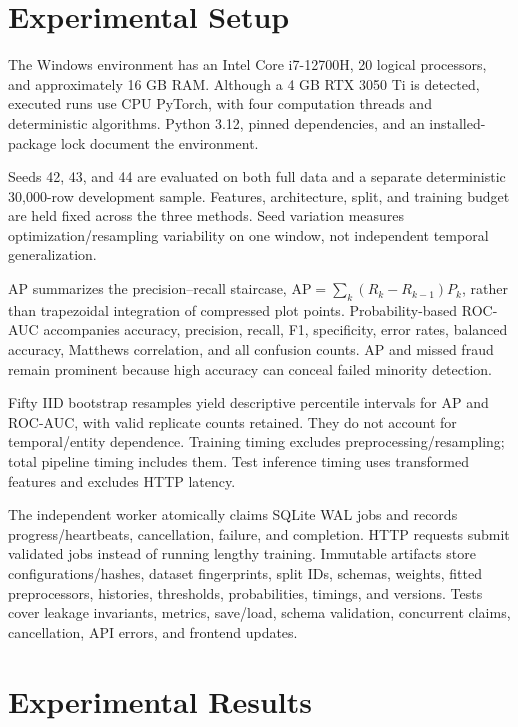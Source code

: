\documentclass[11pt,a4paper]{article}
\begin{document}
\section{Experimental Setup}
The Windows environment has an Intel Core i7-12700H, 20 logical processors, and approximately 16 GB RAM. Although a 4 GB RTX 3050 Ti is detected, executed runs use CPU PyTorch, with four computation threads and deterministic algorithms. Python 3.12, pinned dependencies, and an installed-package lock document the environment.

Seeds 42, 43, and 44 are evaluated on both full data and a separate deterministic 30,000-row development sample. Features, architecture, split, and training budget are held fixed across the three methods. Seed variation measures optimization/resampling variability on one window, not independent temporal generalization.

\begin{table}[ht]
\centering\small
\caption{Recorded primary configuration.}

\end{table}

AP summarizes the precision--recall staircase, $\mathrm{AP}=\sum_k(R_k-R_{k-1})P_k$, rather than trapezoidal integration of compressed plot points. Probability-based ROC-AUC accompanies accuracy, precision, recall, F1, specificity, error rates, balanced accuracy, Matthews correlation, and all confusion counts. AP and missed fraud remain prominent because high accuracy can conceal failed minority detection.

Fifty IID bootstrap resamples yield descriptive percentile intervals for AP and ROC-AUC, with valid replicate counts retained. They do not account for temporal/entity dependence. Training timing excludes preprocessing/resampling; total pipeline timing includes them. Test inference timing uses transformed features and excludes HTTP latency.

The independent worker atomically claims SQLite WAL jobs and records progress/heartbeats, cancellation, failure, and completion. HTTP requests submit validated jobs instead of running lengthy training. Immutable artifacts store configurations/hashes, dataset fingerprints, split IDs, schemas, weights, fitted preprocessors, histories, thresholds, probabilities, timings, and versions. Tests cover leakage invariants, metrics, save/load, schema validation, concurrent claims, cancellation, API errors, and frontend updates.

\section{Experimental Results}

\end{document}
